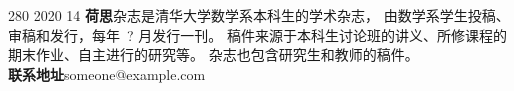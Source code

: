 \documentclass{article}
\begin{document}
    \MakeCover
    {   %
        280
    }{  %
        2020
    }{  %
        14
    }{  %
        \textbf{荷思}杂志是清华大学数学系本科生的学术杂志，
        由数学系学生投稿、审稿和发行，每年\ ? 月发行一刊。
        稿件来源于本科生讨论班的讲义、所修课程的期末作业、自主进行的研究等。
        杂志也包含研究生和教师的稿件。 \\[5pt]
        \textbf{联系地址}\quad someone@example.com
    }
\end{document}
